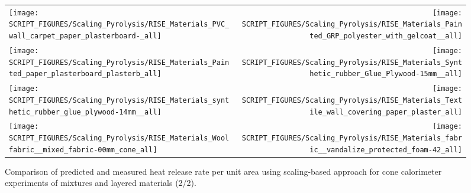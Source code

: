 \begin{figure}[!h]
\begin{tabular*}{\textwidth}{l@{\extracolsep{\fill}}r}
\texttt{[image: SCRIPT\_FIGURES/Scaling\_Pyrolysis/RISE\_Materials\_PVC\_wall\_carpet\_paper\_plasterboard-\_all]} &
\texttt{[image: SCRIPT\_FIGURES/Scaling\_Pyrolysis/RISE\_Materials\_Painted\_GRP\_polyester\_with\_gelcoat\_\_all]} \\
\texttt{[image: SCRIPT\_FIGURES/Scaling\_Pyrolysis/RISE\_Materials\_Painted\_paper\_plasterboard\_plasterb\_all]} &
\texttt{[image: SCRIPT\_FIGURES/Scaling\_Pyrolysis/RISE\_Materials\_Synthetic\_rubber\_Glue\_Plywood-15mm\_\_all]} \\
\texttt{[image: SCRIPT\_FIGURES/Scaling\_Pyrolysis/RISE\_Materials\_synthetic\_rubber\_glue\_plywood-14mm\_\_all]} &
\texttt{[image: SCRIPT\_FIGURES/Scaling\_Pyrolysis/RISE\_Materials\_Textile\_wall\_covering\_paper\_plaster\_all]} \\
\texttt{[image: SCRIPT\_FIGURES/Scaling\_Pyrolysis/RISE\_Materials\_Woolfabric\_\_mixed\_fabric-00mm\_cone\_all]} &
\texttt{[image: SCRIPT\_FIGURES/Scaling\_Pyrolysis/RISE\_Materials\_fabric\_\_vandalize\_protected\_foam-42\_all]} \\
\end{tabular*}
\caption[Heat release rate per unit area of RISE materials using scaling model, mixtures and layered materials]
{Comparison of predicted and measured heat release rate per unit area using scaling-based approach for cone calorimeter experiments of mixtures and layered materials (2/2).}
\label{RISE_Materials_mixtures2}
\end{figure}

\clearpage

